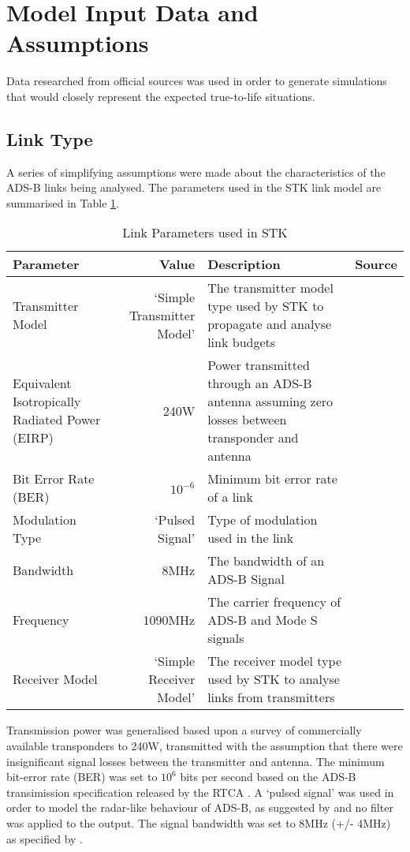 \section{Model Input Data and Assumptions}
Data researched from official sources was used in order to generate simulations that would closely represent the expected true-to-life situations. 
\subsection{Link Type}
A series of simplifying assumptions were made about the characteristics of the ADS-B links being analysed. The parameters used in the STK link model are summarised in Table \ref{tab:linkParams}. 
\begin{table}[H]
  \centering
  \caption{Link Parameters used in STK}
    \begin{tabular}{p{3cm}rp{5cm}r}
    \toprule
    \textbf{Parameter} & \textbf{Value} & \textbf{Description} & \textbf{Source} \\
    \midrule
    Transmitter Model & `Simple Transmitter Model' & The transmitter model type used by STK to propagate and analyse link budgets & \cite{STKOnline} \\ \hline
    Equivalent Isotropically Radiated Power (EIRP) & 240W & Power transmitted through an ADS-B antenna assuming zero losses between transponder and antenna & \cite{Garmin2007,Corporation2011,TrigAvionics,BendixKing2013}  \\ \hline
    Bit Error Rate (BER) & $10^{-6}$ & Minimum bit error rate of a link &  \cite{RTCA2013}  \\ \hline
    Modulation Type & `Pulsed Signal' & Type of modulation used in the link &  \\ \hline
    Bandwidth & 8MHz & The bandwidth of an ADS-B Signal &  \cite{RTCA2013}  \\ \hline
    Frequency & 1090MHz & The carrier frequency of ADS-B and Mode S signals &  \cite{STKOnline} \\ \hline
    Receiver Model & `Simple Receiver Model' & The receiver model type used by STK to analyse links from transmitters &  \cite{STKOnline} \\ 
    \bottomrule
    \end{tabular}%
  \label{tab:linkParams}%
\end{table}%

Transmission power was generalised based upon a survey of commercially available transponders \cite{Garmin2007,Corporation2011,TrigAvionics,BendixKing2013} to 240W, transmitted with the assumption that there were insignificant signal losses between the transmitter and antenna. The minimum bit-error rate (BER) was set to $10^6$ bits per second based on the ADS-B  transimission specification released by the RTCA \cite{RTCA2013}. A `pulsed signal' was used in order to model the radar-like behaviour of ADS-B, as suggested by \cite{STKOnline} and no filter was applied to the output. The signal bandwidth was set to 8MHz (+/- 4MHz) as specified by \cite{RTCA2013}. 

